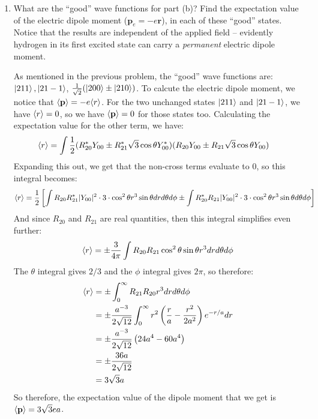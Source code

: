 \documentclass[10pt]{article}
\begin{document}
\begin{enumerate}[label=(\alph*)]
\begin{solution}
		\end{solution}
		\item What are the ``good'' wave functions for part (b)? Find the expectation value of the electric dipole moment ($\mathbf p_e = -e\mathbf r$), in each of these ``good'' states. Notice that the results are independent of the applied field -- evidently hydrogen in its first excited state can carry a \textit{permanent} electric dipole moment.
		
		\begin{solution}
			As mentioned in the previous problem, the ``good'' wave functions are: $\ket{211}, \ket{21-1}$, $\frac{1}{\sqrt{2}}(\ket{200} \pm \ket{210})$. To calcute the electric dipole moment, we notice that $\langle \mathbf p \rangle = -e\langle r \rangle$. For the two unchanged states $\ket{211}$ and $\ket{21-1}$, we have $\langle r \rangle = 0$, so we have $\langle \mathbf p \rangle = 0$ for those states too. Calculating the expectation value for the other term, we have: 
			\begin{align*}
				\langle r \rangle &= \int \frac 12 (R^*_{20}Y_{00} \pm R^*_{21}\sqrt{3} \cos \theta Y^*_{00})(R_{20}Y_{00} \pm R_{21}\sqrt{3}\cos \theta Y_{00})
			\end{align*}
			Expanding this out, we get that the non-cross terms evaluate to 0, so this integral becomes: 
			\[ \langle r \rangle = \frac 12 \left[\int R_{20}R^*_{21}|Y_{00}|^2 \cdot 3\cdot \cos^2 \theta r^3 \sin \theta dr d\theta d\phi \pm \int R^*_{20}R_{21}|Y_{00}|^2 \cdot 3\cdot  \cos^2 \theta r^3 \sin \theta d\theta d\phi\right]\]
			And since $R_{20}$ and $R_{21}$ are real quantities, then this integral simplifies even further: 
			\[ \langle r \rangle = \pm \frac{3}{4\pi} \int R_{20}R_{21} \cos^2 \theta \sin \theta r^3 dr d\theta d\phi\]
			The $\theta$ integral gives $2/3$ and the $\phi$ integral gives $2\pi$, so therefore: 
			\begin{align*}
				\langle r \rangle &= \pm \int_0^\infty R_{21}R_{20}r^3 dr d\theta d\phi \\
				&= \pm \frac{a^{-3}}{2\sqrt{12}}\int_0^\infty r^2\left( \frac ra - \frac{r^2}{2a^2}\right) e^{-r/a} dr\\
				&= \pm \frac{a^{-3}}{2\sqrt{12}}\left( 24 a^4 - 60 a^4\right)\\
				&= \pm\frac{36a}{2\sqrt{12}}\\
				&= 3\sqrt{3}a
			\end{align*}
			So therefore, the expectation value of the dipole moment that we get is $\langle \mathbf p \rangle = 3\sqrt{3}ea$.
		\end{solution}
	\end{enumerate}
\end{document}
